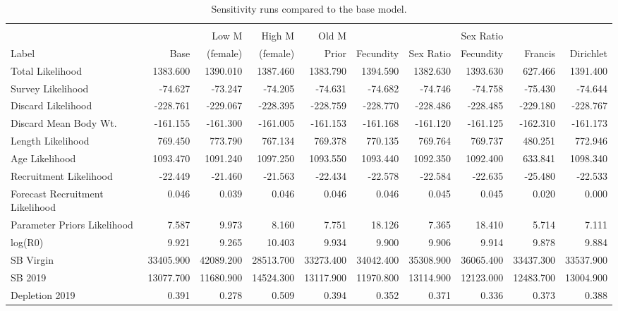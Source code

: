 \documentclass[12pt,]{article}
\begin{document}
\FloatBarrier 

\begin{landscape}
\begingroup\fontsize{9pt}{10pt}\selectfont
\begin{longtable}{lrrrrrrrrr}
\caption{Sensitivity runs compared to the base model.} \\ 
  \hline
 &  &  &  &  &  &  &  &  &  \\ 
        &      & Low M    & High M   &  Old M  &           &            & Sex Ratio &          &          \\
 Label & Base & (female) & (female) &  Prior  & Fecundity &  Sex Ratio & Fecundity & Francis & Dirichlet \\
 \hline
Total Likelihood & 1383.600 & 1390.010 & 1387.460 & 1383.790 & 1394.590 & 1382.630 & 1393.630 & 627.466 & 1391.400 \\ 
  Survey Likelihood & -74.627 & -73.247 & -74.205 & -74.631 & -74.682 & -74.746 & -74.758 & -75.430 & -74.644 \\ 
  Discard Likelihood & -228.761 & -229.067 & -228.395 & -228.759 & -228.770 & -228.486 & -228.485 & -229.180 & -228.767 \\ 
  Discard Mean Body Wt. & -161.155 & -161.300 & -161.005 & -161.153 & -161.168 & -161.120 & -161.125 & -162.310 & -161.173 \\ 
  Length Likelihood & 769.450 & 773.790 & 767.134 & 769.378 & 770.135 & 769.764 & 769.737 & 480.251 & 772.946 \\ 
  Age Likelihood & 1093.470 & 1091.240 & 1097.250 & 1093.550 & 1093.440 & 1092.350 & 1092.400 & 633.841 & 1098.340 \\ 
  Recruitment Likelihood & -22.449 & -21.460 & -21.563 & -22.434 & -22.578 & -22.584 & -22.635 & -25.480 & -22.533 \\ 
  Forecast Recruitment Likelihood & 0.046 & 0.039 & 0.046 & 0.046 & 0.046 & 0.045 & 0.045 & 0.020 & 0.000 \\ 
  Parameter Priors Likelihood & 7.587 & 9.973 & 8.160 & 7.751 & 18.126 & 7.365 & 18.410 & 5.714 & 7.111 \\ 
  log(R0) & 9.921 & 9.265 & 10.403 & 9.934 & 9.900 & 9.906 & 9.914 & 9.878 & 9.884 \\ 
  SB Virgin & 33405.900 & 42089.200 & 28513.700 & 33273.400 & 34042.400 & 35308.900 & 36065.400 & 33437.300 & 33537.900 \\ 
  SB 2019 & 13077.700 & 11680.900 & 14524.300 & 13117.900 & 11970.800 & 13114.900 & 12123.000 & 12483.700 & 13004.900 \\ 
  Depletion 2019 & 0.391 & 0.278 & 0.509 & 0.394 & 0.352 & 0.371 & 0.336 & 0.373 & 0.388 \\ 

\end{longtable}
\end{landscape}
\end{document}

